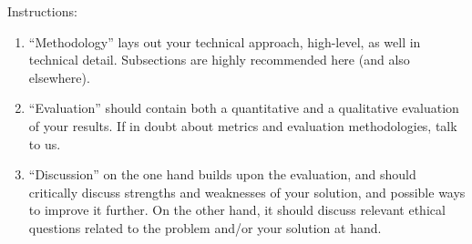 \documentclass[11pt]{article}
\begin{document}
% 


Instructions: 
\begin{enumerate}

    \item ``Methodology'' lays out your technical approach, high-level, as well in technical detail. Subsections are highly recommended here (and also elsewhere).
    \item ``Evaluation'' should contain both a quantitative and a qualitative evaluation of your results. If in doubt about metrics and evaluation methodologies, talk to us.
    \item ``Discussion'' on the one hand builds upon the evaluation, and should critically discuss strengths and weaknesses of your solution, and possible ways to improve it further. On the other hand, it should discuss relevant ethical questions related to the problem and/or your solution at hand.
\end{enumerate}
\end{document}
